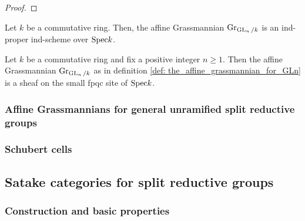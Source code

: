                 \begin{proof}
                        
                \end{proof}
            \begin{corollary} \label{coro: affine_grassmannian_for_GLn_is_an_ind_scheme}
                Let $k$ be a commutative ring. Then, the affine Grassmannian $\mathrm{Gr}_{\operatorname{GL}_n/k}$ is an ind-proper ind-scheme over $\mathrm{Spec} k$. 
            \end{corollary}
            \begin{corollary} \label{lemma: the_affine_grassmannian_for_GLn_is_an_fpqc_sheaf}
                Let $k$ be a commutative ring and fix a positive integer $n \geq 1$. Then the affine Grassmannian $\mathrm{Gr}_{\operatorname{GL}_n/k}$ as in definition \ref{def: the_affine_grassmannian_for_GLn} is a sheaf on the small fpqc site of $\mathrm{Spec} k$.
            \end{corollary}
                
        \subsubsection{Affine Grassmannians for general unramified split reductive groups}
        
        \subsubsection{Schubert cells}
            \begin{remark} \label{remark:" action_of_loop_groups_on_affine_grassmannians}
                
            \end{remark}
            \begin{convention} \label{conv: loop_group_orbits_inside_affine_grassmannians}
                
            \end{convention}
        
    \subsection{Satake categories for split reductive groups}
        \subsubsection{Construction and basic properties}
        
